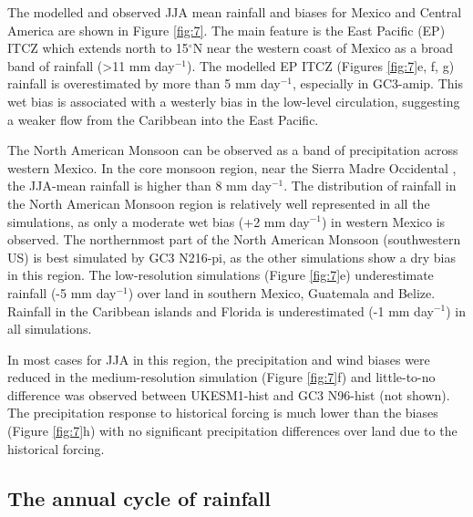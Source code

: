 The modelled and observed JJA mean rainfall and biases for Mexico and Central America are shown in Figure \ref{fig:7}.
The main feature is the East Pacific (EP) ITCZ which extends north to 15$^\circ$N near the western coast of Mexico as a broad band of rainfall (>11 mm day$^{-1}$).
 The modelled EP ITCZ (Figures \ref{fig:7}e, f, g) rainfall is overestimated by more than 5 mm day$^{-1}$, especially in GC3-amip. This wet bias is associated with a westerly bias in the low-level circulation, suggesting a weaker flow from the Caribbean into the East Pacific.

The North American Monsoon can be observed as a band of precipitation across western Mexico. In the core monsoon region, near the Sierra Madre Occidental \citep{adams1997, zhou2016}, the JJA-mean rainfall is higher than 8 mm day$^{-1}$. %
The distribution of rainfall in the North American Monsoon region is relatively well represented in all the simulations, as only a moderate wet bias (+2 mm day$^{-1}$) in western Mexico is observed.
The northernmost part of the North American Monsoon (southwestern US) is best simulated by GC3 N216-pi, as the other simulations show a dry bias in this region.
The low-resolution simulations (Figure \ref{fig:7}e) underestimate rainfall (-5 mm day$^{-1}$) over land in southern Mexico, Guatemala and Belize.
Rainfall in the Caribbean islands and Florida is underestimated (-1 mm day$^{-1}$) in all simulations.

In most cases for JJA in this region, the precipitation and wind biases were reduced in the medium-resolution simulation (Figure \ref{fig:7}f) and little-to-no difference was observed between UKESM1-hist and GC3 N96-hist (not shown).
The precipitation response to historical forcing is much lower than the biases (Figure \ref{fig:7}h) with no significant precipitation differences over land due to the historical forcing. %
 

\subsection{The annual cycle of rainfall}\label{sq:raincycle}

